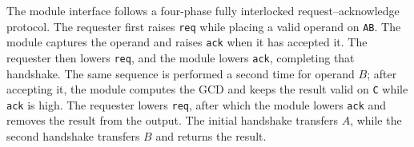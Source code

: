 The module interface follows a four-phase fully interlocked request--acknowledge protocol. The requester first raises \texttt{req} while placing a valid operand on \texttt{AB}. The module captures the operand and raises \texttt{ack} when it has accepted it. The requester then lowers \texttt{req}, and the module lowers \texttt{ack}, completing that handshake. The same sequence is performed a second time for operand $B$; after accepting it, the module computes the GCD and keeps the result valid on \texttt{C} while \texttt{ack} is high. The requester lowers \texttt{req}, after which the module lowers \texttt{ack} and removes the result from the output. The initial handshake transfers $A$, while the second handshake transfers $B$ and returns the result.